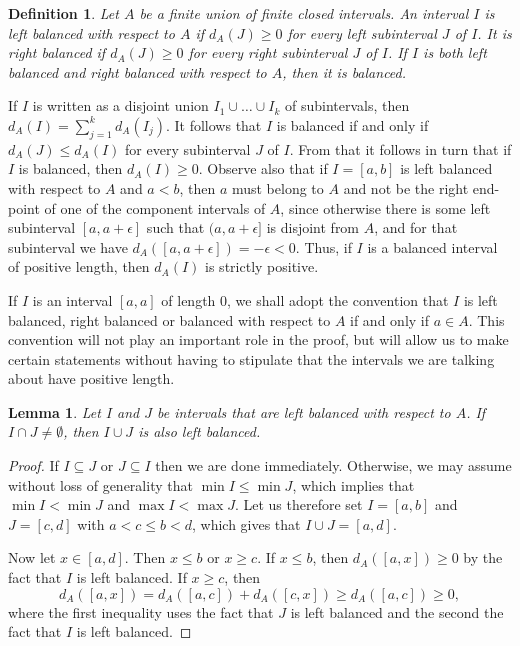 \documentclass[11pt,reqno]{amsart}
\newtheorem{lemma}[theorem]{Lemma}
\newtheorem{definition}[theorem]{Definition}
\theoremstyle{definition}
\def\e{\epsilon}
\def\subset{\subseteq}
\begin{document}
\begin{definition} Let $A$ be a finite union of finite closed intervals. An interval $I$ is \emph{left balanced} with respect to $A$ if $d_A(J)\geq 0$ for every left subinterval $J$ of $I$. It is \emph{right balanced} if $d_A(J)\geq 0$ for every right subinterval $J$ of $I$. If $I$ is both left balanced and right balanced with respect to $A$, then it is \emph{balanced}. 
\end{definition} 

If $I$ is written as a disjoint union $I_1\cup\dots\cup I_k$ of subintervals, then $d_A(I)=\sum_{j=1}^kd_A(I_j)$. It follows that $I$ is balanced if and only if $d_A(J)\leq d_A(I)$ for every subinterval $J$ of $I$. From that it follows in turn that if $I$ is balanced, then $d_A(I)\geq 0$. Observe also that if $I=[a,b]$ is left balanced with respect to $A$ and $a<b$, then $a$ must belong to $A$ and not be the right end-point of one of the component intervals of $A$, since otherwise there is some left subinterval $[a,a+\e]$ such that $(a,a+\e]$ is disjoint from $A$, and for that subinterval we have $d_A([a,a+\e])=-\e<0$. Thus, if $I$ is a balanced interval of positive length, then $d_A(I)$ is strictly positive.

If $I$ is an interval $[a,a]$ of length 0, we shall adopt the convention that $I$ is left balanced, right balanced or balanced with respect to $A$ if and only if $a\in A$. This convention will not play an important role in the proof, but will allow us to make certain statements without having to stipulate that the intervals we are talking about have positive length. 

\begin{lemma} \label{union left balanced} Let $I$ and $J$ be intervals that are left balanced with respect to $A$. If $I\cap J\ne\emptyset$, then $I\cup J$ is also left balanced.
\end{lemma}

\begin{proof}
If $I\subset J$ or $J\subset I$ then we are done immediately. Otherwise, we may assume without loss of generality that $\min I\leq\min J$, which implies that $\min I<\min J$ and $\max I<\max J$. Let us therefore set $I=[a,b]$ and $J=[c,d]$ with $a<c\leq b<d$, which gives that $I\cup J=[a,d]$. 

Now let $x\in[a,d]$. Then $x\leq b$ or $x\geq c$. If $x\leq b$, then $d_A([a,x])\geq 0$ by the fact that $I$ is left balanced. If $x\geq c$, then 
\[d_A([a,x])=d_A([a,c])+d_A([c,x])\geq d_A([a,c])\geq 0,\]
where the first inequality uses the fact that $J$ is left balanced and the second the fact that $I$ is left balanced.
\end{proof}
\end{document}
